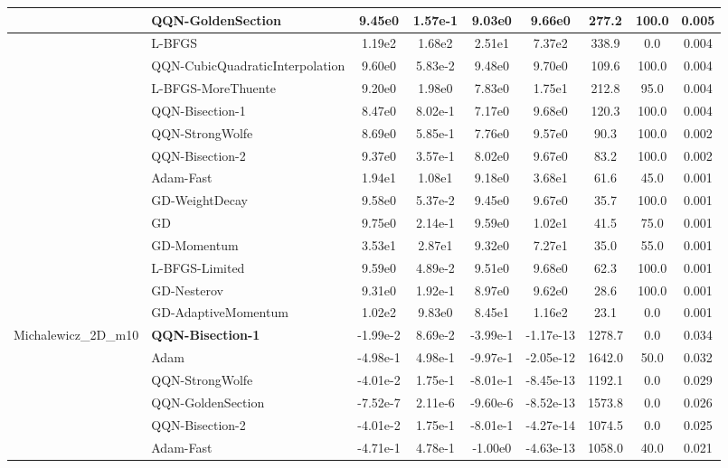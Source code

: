\documentclass{article}
\begin{document}
\begin{longtable}{|l|l|c|c|c|c|c|c|c|}
\hline
 & QQN-GoldenSection & 9.45e0 & 1.57e-1 & 9.03e0 & 9.66e0 & 277.2 & 100.0 & 0.005 \\
\hline
 & L-BFGS & 1.19e2 & 1.68e2 & 2.51e1 & 7.37e2 & 338.9 & 0.0 & 0.004 \\
\hline
 & QQN-CubicQuadraticInterpolation & 9.60e0 & 5.83e-2 & 9.48e0 & 9.70e0 & 109.6 & 100.0 & 0.004 \\
\hline
 & L-BFGS-MoreThuente & 9.20e0 & 1.98e0 & 7.83e0 & 1.75e1 & 212.8 & 95.0 & 0.004 \\
\hline
 & QQN-Bisection-1 & 8.47e0 & 8.02e-1 & 7.17e0 & 9.68e0 & 120.3 & 100.0 & 0.004 \\
\hline
 & QQN-StrongWolfe & 8.69e0 & 5.85e-1 & 7.76e0 & 9.57e0 & 90.3 & 100.0 & 0.002 \\
\hline
 & QQN-Bisection-2 & 9.37e0 & 3.57e-1 & 8.02e0 & 9.67e0 & 83.2 & 100.0 & 0.002 \\
\hline
 & Adam-Fast & 1.94e1 & 1.08e1 & 9.18e0 & 3.68e1 & 61.6 & 45.0 & 0.001 \\
\hline
 & GD-WeightDecay & 9.58e0 & 5.37e-2 & 9.45e0 & 9.67e0 & 35.7 & 100.0 & 0.001 \\
\hline
 & GD & 9.75e0 & 2.14e-1 & 9.59e0 & 1.02e1 & 41.5 & 75.0 & 0.001 \\
\hline
 & GD-Momentum & 3.53e1 & 2.87e1 & 9.32e0 & 7.27e1 & 35.0 & 55.0 & 0.001 \\
\hline
 & L-BFGS-Limited & 9.59e0 & 4.89e-2 & 9.51e0 & 9.68e0 & 62.3 & 100.0 & 0.001 \\
\hline
 & GD-Nesterov & 9.31e0 & 1.92e-1 & 8.97e0 & 9.62e0 & 28.6 & 100.0 & 0.001 \\
\hline
 & GD-AdaptiveMomentum & 1.02e2 & 9.83e0 & 8.45e1 & 1.16e2 & 23.1 & 0.0 & 0.001 \\
Michalewicz\_2D\_m10 & \textbf{QQN-Bisection-1} & -1.99e-2 & 8.69e-2 & -3.99e-1 & -1.17e-13 & 1278.7 & 0.0 & 0.034 \\
\hline
 & Adam & -4.98e-1 & 4.98e-1 & -9.97e-1 & -2.05e-12 & 1642.0 & 50.0 & 0.032 \\
\hline
 & QQN-StrongWolfe & -4.01e-2 & 1.75e-1 & -8.01e-1 & -8.45e-13 & 1192.1 & 0.0 & 0.029 \\
\hline
 & QQN-GoldenSection & -7.52e-7 & 2.11e-6 & -9.60e-6 & -8.52e-13 & 1573.8 & 0.0 & 0.026 \\
\hline
 & QQN-Bisection-2 & -4.01e-2 & 1.75e-1 & -8.01e-1 & -4.27e-14 & 1074.5 & 0.0 & 0.025 \\
\hline
 & Adam-Fast & -4.71e-1 & 4.78e-1 & -1.00e0 & -4.63e-13 & 1058.0 & 40.0 & 0.021 \\

\end{longtable}
\end{document}
